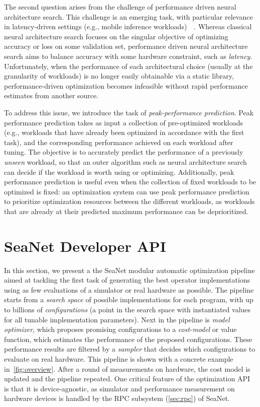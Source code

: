 The second question arises from the challenge of performance driven neural architecture search.
This challenge is an emerging task, with particular relevance in latency-driven settings (e.g., mobile inference workloads)~\cite{tan2019mnasnet}~\cite{2018arXiv181200332C}.
Whereas classical neural architecture search focuses on the singular objective of optimizing accuracy or loss on some validation set, performance driven neural architecture search aims to balance accuracy with some hardware constraint, such as \emph{latency}.
Unfortunately, when the performance of each architectural choice (usually at the granularity of workloads) is no longer easily obtainable via a static library, performance-driven optimization becomes infeasible without rapid performance estimates from another source.

To address this issue, we introduce the task of \emph{peak-performance prediction}.
Peak performance prediction takes as input a collection of pre-optimized workloads (e.g., workloads that have already been optimized in accordance with the first task), and the corresponding performance achieved on each workload after tuning.
The objective is to accurately predict the performance of a previously \emph{unseen} workload, so that an outer algorithm such as neural architecture search can decide if the workload is worth using or optimizing.
Additionally, peak performance prediction is useful even when the collection of fixed workloads to be optimized is fixed: an optimization system can use peak performance prediction to prioritize optimization resources between the different workloads, as workloads that are already at their predicted maximum performance can be deprioritized.

\section{SeaNet Developer API}
In this section, we present a the SeaNet modular automatic optimization pipeline aimed at tackling the first task of generating the best operator implementations using as few evaluations of a simulator or real hardware as possible.
The pipeline starts from a \emph{search space} of possible implementations for each program, with up to billions of \emph{configurations} (a point in the search space with instantiated values for all tunable implementation parameters).
Next in the pipeline is \emph{model optimizer}, which proposes promising configurations to a \emph{cost-model} or value function, which estimates the performance of the proposed configurations.
These performance results are filtered by a \emph{sampler} that  decides which configurations to evaluate on real hardware. This pipeline is shown with a concrete example in~\autoref{fig:overview}.
After a round of measurements on hardware, the cost model is updated and the pipeline repeated.
One critical feature of the optimization API is that it is device-agnostic, as simulator and performance measurement on hardware devices is handled by the RPC subsystem (\autoref{sec:rpc}) of SeaNet.


